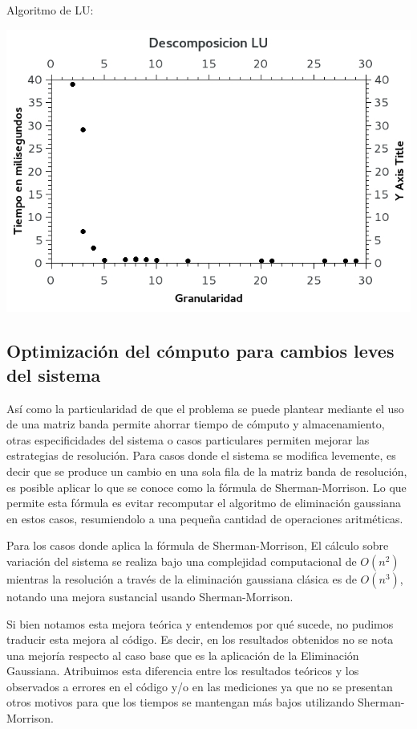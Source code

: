Algoritmo de LU:
\begin{center}
 \includegraphics[width=400pt]{graficas/LU.jpg}
\end{center}

\subsection{Optimizaci\'on del c\'omputo para cambios leves del sistema}

As\'i como la particularidad de que el problema se puede plantear mediante el uso de una matriz banda permite ahorrar tiempo de c\'omputo y almacenamiento, otras especificidades del sistema o casos particulares permiten mejorar las estrategias de resoluci\'on. Para casos donde el sistema se modifica levemente, es decir que se produce un cambio en una sola fila de la matriz banda de resoluci\'on, es posible aplicar lo que se conoce como la f\'ormula de Sherman-Morrison. Lo que permite esta f\'ormula es evitar recomputar el algoritmo de eliminaci\'on gaussiana en estos casos, resumiendolo a una peque\~na cantidad de operaciones aritm\'eticas.

Para los casos donde aplica la f\'ormula de Sherman-Morrison, El c\'alculo sobre variaci\'on del sistema se realiza bajo una complejidad computacional de $O(n^2)$ mientras la resoluci\'on a trav\'es de la eliminaci\'on gaussiana cl\'asica es de $O(n^3)$, notando una mejora sustancial usando Sherman-Morrison.

Si bien notamos esta mejora te\'orica y entendemos por qu\'e sucede, no pudimos traducir esta mejora al c\'odigo. Es decir, en los resultados obtenidos no se nota una mejor\'ia respecto al caso base que es la aplicaci\'on de la Eliminaci\'on Gaussiana. Atribuimos esta diferencia entre los resultados te\'oricos y los observados a errores en el c\'odigo y/o en las mediciones ya que no se presentan otros motivos para que los tiempos se mantengan m\'as bajos utilizando Sherman-Morrison.
